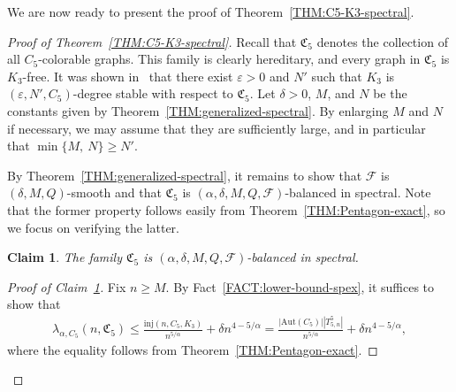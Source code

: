 \documentclass[11pt,a4paper]{article}
\newtheorem{claim}[definition]{Claim}
\begin{document}
We are now ready to present the proof of Theorem~\ref{THM:C5-K3-spectral}. 
%
\begin{proof}[Proof of Theorem~\ref{THM:C5-K3-spectral}]
    Recall that $\mathfrak{C}_{5}$ denotes the collection of all $C_5$-colorable graphs. 
    This family is clearly hereditary, and every graph in $\mathfrak{C}_{5}$ is $K_{3}$-free.
    It was shown in~{\cite[Theorem~2.3]{CL24}} that there exist $\varepsilon > 0$ and $N'$ such that $K_{3}$ is $(\varepsilon, N', C_5)$-degree stable with respect to $\mathfrak{C}_{5}$. 
    Let $\delta > 0$, $M$, and $N$ be the constants given by Theorem~\ref{THM:generalized-spectral}. 
    By enlarging $M$ and $N$ if necessary, we may assume that they are sufficiently large, and in particular that $\min\{M,~N\} \ge N'$. 
    
    By Theorem~\ref{THM:generalized-spectral}, it remains to show that $\mathcal{F}$ is $(\delta, M, Q)$-smooth and that $\mathfrak{C}_{5}$ is $(\alpha, \delta, M, Q, \mathcal{F})$-balanced in spectral. 
    Note that the former property follows easily from Theorem~\ref{THM:Pentagon-exact}, so we focus on verifying the latter.

    \begin{claim}\label{CLAIM:C5K3-spectral-balanced}
        The family $\mathfrak{C}_{5}$ is $(\alpha, \delta, M, Q, \mathcal{F})$-balanced in spectral. 
    \end{claim}
    \begin{proof}[Proof of Claim~\ref{CLAIM:C5K3-spectral-balanced}]
        Fix $n \ge M$. 
        By Fact~\ref{FACT:lower-bound-spex}, it suffices to show that 
        \begin{align}\label{equ:spectral-C5-upper-bound}
            \lambda_{\alpha, C_5}(n, \mathfrak{C}_5)
            \le \frac{\mathrm{inj}(n,C_5, K_3)}{n^{5/\alpha}}
            + \delta n^{4-5/\alpha}
            = \frac{|\mathrm{Aut}(C_5)| |T_{5,n}^{5}|}{n^{5/\alpha}} + \delta n^{4-5/\alpha},  
        \end{align}
        where the equality follows from Theorem~\ref{THM:Pentagon-exact}. 
        

\end{proof}
\end{proof}
\end{document}
